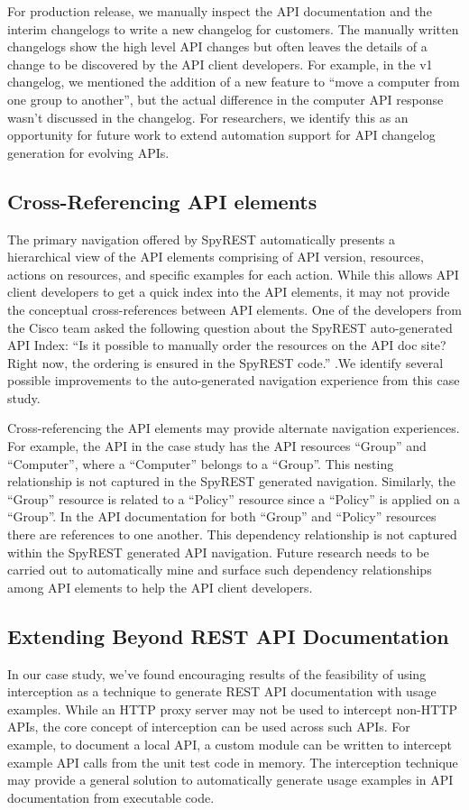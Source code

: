 \documentclass[10pt, conference]{IEEEtran}
\begin{document}
For production release, we manually inspect the API documentation and the interim changelogs to write a new changelog for customers. The manually written changelogs show the high level API changes but often leaves the details of a change to be discovered by the API client developers. For example, in the v1 changelog, we mentioned the addition of a new feature to ``move a computer from one group to another'', but the actual difference in the computer API response wasn't discussed in the changelog. For researchers, we identify this as an opportunity for future work to extend automation support for API changelog generation for evolving APIs.

\subsection{Cross-Referencing API elements}
The primary navigation offered by SpyREST automatically presents a hierarchical view of the API elements comprising of API version, resources, actions on resources, and specific examples for each action. While this allows API client developers to get a quick index into the API elements, it may not provide the conceptual cross-references between API elements. One of the developers from the Cisco team asked the following question about the SpyREST auto-generated API Index: ``Is it possible to manually order the resources on the API doc site? Right now, the ordering is ensured in the SpyREST code.'' .We identify several possible improvements to the auto-generated navigation experience from this case study.

Cross-referencing the API elements may provide alternate navigation experiences. For example, the API in the case study has the API resources ``Group'' and ``Computer'', where a ``Computer'' belongs to a ``Group''. This nesting relationship is not captured in the SpyREST generated navigation. Similarly, the ``Group'' resource is related to a ``Policy'' resource since a ``Policy'' is applied on a ``Group''. In the API documentation for both ``Group'' and ``Policy'' resources there are references to one another. This dependency relationship is not captured within the SpyREST generated API navigation. Future research needs to be carried out to automatically mine and surface such dependency relationships among API elements to help the API client developers.


\subsection{Extending Beyond REST API Documentation}
In our case study, we've found encouraging results of the feasibility of using interception as a technique to generate REST API documentation with usage examples. While an HTTP proxy server may not be used to intercept non-HTTP APIs, the core concept of interception can be used across such APIs. For example, to document a local API, a custom module can be written to intercept example API calls from the unit test code in memory. The interception technique may provide a general solution to automatically generate usage examples in API documentation from executable code.
\end{document}
